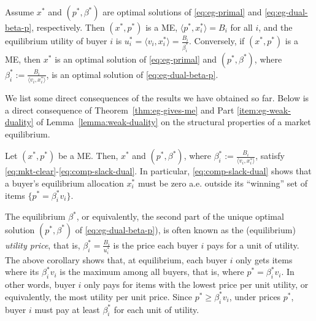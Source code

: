 \begin{theorem}
	Assume $x^*$ and $(p^*, \beta^*)$ are optimal solutions of \eqref{eq:eg-primal} and \eqref{eq:eg-dual-beta-p}, respectively. 
	Then $(x^*, p^*)$ is a ME, $\langle p^*, x^*_i \rangle = B_i$ for all $i$, and the equilibrium utility of buyer $i$ is $u^*_i = \langle v_i, x^*_i \rangle = \frac{B_i}{\beta^*_i}$. 
	Conversely, if $(x^*, p^*)$ is a ME, then $x^*$ is an optimal solution of \eqref{eq:eg-primal} and $(p^*, \beta^*)$, where $\beta^*_i := \frac{B_i}{\langle v_i, x^*_i\rangle}$, is an optimal solution of \eqref{eq:eg-dual-beta-p}.
	\label{thm:eg-gives-me}
\end{theorem}
We list some direct consequences of the results we have obtained so far. Below is a direct consequence of Theorem~\ref{thm:eg-gives-me} and Part \ref{item:eg-weak-duality} of Lemma~\ref{lemma:weak-duality} on the structural properties of a market equilibrium.
\begin{corollary}
	Let $(x^*, p^*)$ be a ME. 
	Then, $x^*$ and $(p^*, \beta^*)$, where $\beta^*_i := \frac{B_i}{\langle v_i, x^*_i\rangle}$, satisfy \eqref{eq:mkt-clear}-\eqref{eq:comp-slack-dual}. In particular, \eqref{eq:comp-slack-dual} shows that a buyer's equilibrium allocation $x^*_i$ must be zero a.e. outside its ``winning'' set of items $\{p^* = \beta^*_i v_i \}$.
	\label{cor:me-structiral-properties}
\end{corollary}
	The equilibrium $\beta^*$, or equivalently, the second part of the unique optimal solution $(p^*, \beta^*)$ of \eqref{eq:eg-dual-beta-p}), is often known as the (equilibrium) \emph{utility price}, that is, $\beta^*_i = \frac{B_i}{u^*_i}$ is the price each buyer $i$ pays for a unit of utility. The above corollary shows that, at equilibrium, each buyer $i$ only gets items where its $\beta^*_i v_i$ is the maximum among all buyers, that is, where $p^* = \beta^*_i v_i$. 
	In other words, buyer $i$ only pays for items with the lowest price per unit utility, or equivalently, the most utility per unit price.
	Since $p^* \geq \beta^*_i v_i$, under prices $p^*$, buyer $i$ must pay at least $\beta^*_i$ for each unit of utility.
